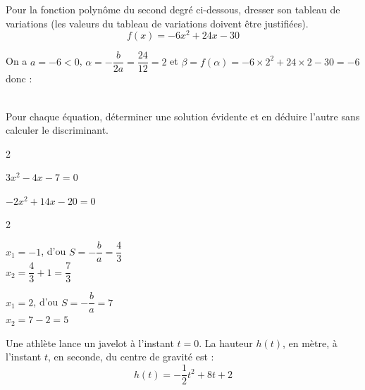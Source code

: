 \documentclass[12pt,a4paper]{article}  %
\begin{document}
\vspace{-0.3cm}
Pour la fonction polynôme du second degré ci-dessous, dresser son tableau de variations (les valeurs du tableau de variations doivent être justifiées).
$$f(x)=-6x^2+24x-30$$

\begin{corrBox}
	On a $a=-6<0$, $\alpha=-\dfrac{b}{2a}=\dfrac{24}{12}=2$ et $\beta=f(\alpha)=-6\times 2^2+24\times 2-30=-6$ donc :\\
	\ \\
\end{corrBox}

\vspace{-0.3cm}

Pour chaque équation, déterminer une solution évidente et en déduire l'autre sans calculer le discriminant.
\begin{multicols}{2}
\begin{enumMet}
    \item $3x^2-4x-7=0$ \quad {}
    \item $-2x^2+14x-20=0$ \quad {}
\end{enumMet}
\end{multicols}

\begin{corrBox}
	\begin{multicols}{2}
		\begin{enumMet}
			\item $x_1=-1$, d'ou $S=-\dfrac{b}{a}=\dfrac{4}{3}$\\
			$x_2=\dfrac{4}{3}+1=\dfrac{7}{3}$
			\item $x_1=2$, d'ou $S=-\dfrac{b}{a}=7$\\
			$x_2=7-2=5$
		\end{enumMet}
	\end{multicols}
\end{corrBox}



Une athlète lance un javelot à l'instant $t=0$. La hauteur $h(t)$, en mètre, à l'instant $t$, en seconde, du centre de gravité est :
$$
h(t)=-\frac{1}{2} t^2+8 t+2
$$
\end{document}
